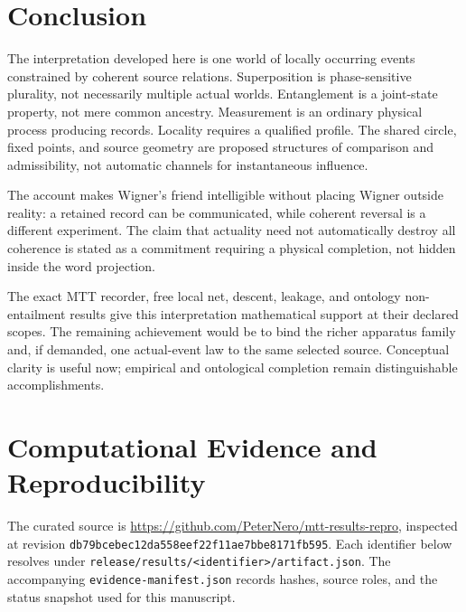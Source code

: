 \documentclass[11pt,a4paper]{article}
\begin{document}
\section{Conclusion}
The interpretation developed here is one world of locally occurring events constrained by coherent source relations. Superposition is phase-sensitive plurality, not necessarily multiple actual worlds. Entanglement is a joint-state property, not mere common ancestry. Measurement is an ordinary physical process producing records. Locality requires a qualified profile. The shared circle, fixed points, and source geometry are proposed structures of comparison and admissibility, not automatic channels for instantaneous influence.

The account makes Wigner's friend intelligible without placing Wigner outside reality: a retained record can be communicated, while coherent reversal is a different experiment. The claim that actuality need not automatically destroy all coherence is stated as a commitment requiring a physical completion, not hidden inside the word projection.

The exact MTT recorder, free local net, descent, leakage, and ontology non-entailment results give this interpretation mathematical support at their declared scopes. The remaining achievement would be to bind the richer apparatus family and, if demanded, one actual-event law to the same selected source. Conceptual clarity is useful now; empirical and ontological completion remain distinguishable accomplishments.

\section*{Computational Evidence and Reproducibility}
\begingroup
\raggedright
The curated source is \url{https://github.com/PeterNero/mtt-results-repro},
inspected at revision \texttt{db79bcebec12da558eef22f11ae7bbe8171fb595}.
Each identifier below resolves under
\texttt{release/results/<identifier>/artifact.json}.
The accompanying \texttt{evidence-manifest.json} records hashes, source roles,
and the status snapshot used for this manuscript.
\end{document}
